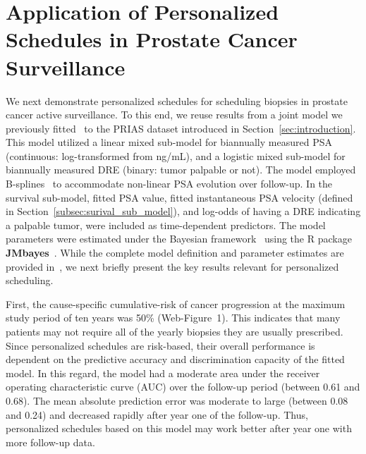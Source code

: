 \documentclass[useAMS, usenatbib, referee]{biom}
\begin{document}
\section{Application of Personalized Schedules in Prostate Cancer Surveillance}
\label{sec:results}
We next demonstrate personalized schedules for scheduling biopsies in prostate cancer active surveillance. To this end, we reuse results from a joint model we previously fitted~\citep{tomer2019personalized} to the PRIAS dataset introduced in Section~\ref{sec:introduction}. This model utilized a linear mixed sub-model for biannually measured PSA (continuous: log-transformed from ng/mL), and a logistic mixed sub-model for biannually measured DRE (binary: tumor palpable or not). The model employed B-splines~\citep{de1978practical} to accommodate non-linear PSA evolution over follow-up. In the survival sub-model, fitted PSA value, fitted instantaneous PSA velocity (defined in Section~\ref{subsec:surival_sub_model}), and log-odds of having a DRE indicating a palpable tumor, were included as time-dependent predictors. The model parameters were estimated under the Bayesian framework~\citep{tomer2019personalized} using the R package \textbf{JMbayes}~\citep{rizopoulosJMbayes}. While the complete model definition and parameter estimates are provided in~\citet{tomer2019personalized}, we next briefly present the key results relevant for personalized scheduling.

First, the cause-specific cumulative-risk of cancer progression at the maximum study period of ten years was 50\% (Web-Figure~1). This indicates that many patients may not require all of the yearly biopsies they are usually prescribed. Since personalized schedules are risk-based, their overall performance is dependent on the predictive accuracy and discrimination capacity of the fitted model. In this regard, the model had a moderate area under the receiver operating characteristic curve (AUC) over the follow-up period (between 0.61 and 0.68). The mean absolute prediction error was moderate to large (between 0.08 and 0.24) and decreased rapidly after year one of the follow-up. Thus, personalized schedules based on this model may work better after year one with more follow-up data.
\end{document}
